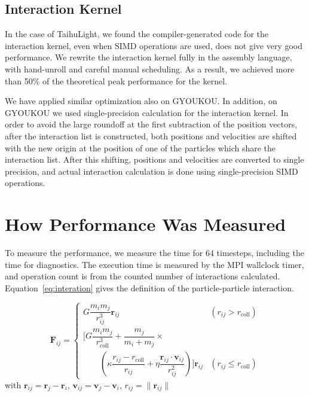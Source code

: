 \documentclass[conference]{IEEEtran}
\begin{document}
\subsection{Interaction Kernel}

In the case of TaihuLight, we found the compiler-generated code for
the interaction kernel, even when SIMD operations are used, does not
give very good performance. We rewrite the interaction kernel fully in
the assembly language, with hand-unroll and careful manual scheduling. As
a result, we achieved more than 50\% of the theoretical peak
performance for the kernel.

We have applied similar optimization also
on GYOUKOU. In addition, on GYOUKOU we used single-precision
calculation for the interaction kernel. In order to avoid the large
roundoff at the first subtraction of the position vectors, after the
interaction list is constructed, both positions and velocities are
shifted with the new origin at the position of one of the particles which share the
interaction list. After this shifting, positions and velocities are
converted to single precision, and actual interaction calculation is
done using single-precision SIMD operations.


\section{How Performance Was Measured}


To measure the performance, we measure the time for 64 timesteps,
including the time for  diagnostics. 
The
execution time is measured by the MPI wallclock timer, and operation
count is from the counted number of interactions
calculated. Equation~\ref{eq:interation}  gives the definition of the
particle-particle interaction. 

{%
\begin{equation}
  \bm F_{ij} = \begin{cases} G \dfrac{m_i m_j}
    {r_{ij}^3} \bm r_{ij} & \left(r_{ij} > r_\text{coll} \right)
    \\
    \Biggl[  G \dfrac{m_i m_j} {r_\text{coll}^3}  + \dfrac{m_j}{m_i
        + m_j}  \times \\ \qquad  \left(      \kappa \dfrac{r_{ij} -
        r_\text{coll}}{r_{ij}}    + \eta \dfrac{\bm r_{ij} \cdot \bm
        v_{ij}}{r_{ij}^2}    \right) \Biggr] \bm r_{ij} & \left(
    r_{ij} \le r_\text{coll} \right) \end{cases}
  \label{eq:interation} 
\end{equation}
}
with
$\bm r_{ij} = \bm r_j - \bm r_i$, $\bm v_{ij} = \bm v_j - \bm v_i$,
$r_{ij} = \| \bm r_{ij} \|$
\end{document}

